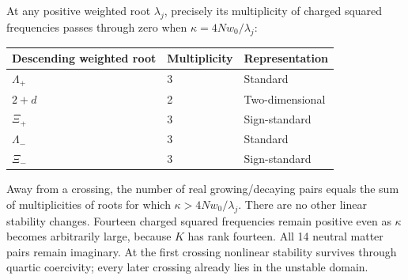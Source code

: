 \documentclass[11pt,a4paper]{article}
\begin{document}
At any positive weighted root $\lambda_j$, precisely its multiplicity of charged squared frequencies passes through zero when $\kappa=4Nw_0/\lambda_j$:
\begin{center}
\begin{tabular}{lll}
\toprule
Descending weighted root & Multiplicity & Representation\\
\midrule
$\Lambda_+$ & 3 & Standard\\
$2+d$ & 2 & Two-dimensional\\
$\Xi_+$ & 3 & Sign-standard\\
$\Lambda_-$ & 3 & Standard\\
$\Xi_-$ & 3 & Sign-standard\\
\bottomrule
\end{tabular}
\end{center}
Away from a crossing, the number of real growing/decaying pairs equals the sum of multiplicities of roots for which $\kappa>4Nw_0/\lambda_j$. There are no other linear stability changes. Fourteen charged squared frequencies remain positive even as $\kappa$ becomes arbitrarily large, because $K$ has rank fourteen. All 14 neutral matter pairs remain imaginary. At the first crossing nonlinear stability survives through quartic coercivity; every later crossing already lies in the unstable domain.
\end{document}
